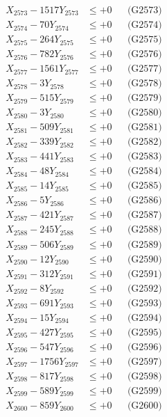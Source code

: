 \documentclass[a4paper,10pt]{article}
\begin{document}
{\begin{align}
X_{2573} - 1517Y_{2573} &\leq +0 && \text{(G2573)} \\
X_{2574} - 70Y_{2574} &\leq +0 && \text{(G2574)} \\
X_{2575} - 264Y_{2575} &\leq +0 && \text{(G2575)} \\
X_{2576} - 782Y_{2576} &\leq +0 && \text{(G2576)} \\
X_{2577} - 1561Y_{2577} &\leq +0 && \text{(G2577)} \\
X_{2578} - 3Y_{2578} &\leq +0 && \text{(G2578)} \\
X_{2579} - 515Y_{2579} &\leq +0 && \text{(G2579)} \\
X_{2580} - 3Y_{2580} &\leq +0 && \text{(G2580)} \\
\allowbreak
X_{2581} - 509Y_{2581} &\leq +0 && \text{(G2581)} \\
X_{2582} - 339Y_{2582} &\leq +0 && \text{(G2582)} \\
X_{2583} - 441Y_{2583} &\leq +0 && \text{(G2583)} \\
X_{2584} - 48Y_{2584} &\leq +0 && \text{(G2584)} \\
X_{2585} - 14Y_{2585} &\leq +0 && \text{(G2585)} \\
X_{2586} - 5Y_{2586} &\leq +0 && \text{(G2586)} \\
X_{2587} - 421Y_{2587} &\leq +0 && \text{(G2587)} \\
X_{2588} - 245Y_{2588} &\leq +0 && \text{(G2588)} \\
X_{2589} - 506Y_{2589} &\leq +0 && \text{(G2589)} \\
X_{2590} - 12Y_{2590} &\leq +0 && \text{(G2590)} \\
\allowbreak
X_{2591} - 312Y_{2591} &\leq +0 && \text{(G2591)} \\
X_{2592} - 8Y_{2592} &\leq +0 && \text{(G2592)} \\
X_{2593} - 691Y_{2593} &\leq +0 && \text{(G2593)} \\
X_{2594} - 15Y_{2594} &\leq +0 && \text{(G2594)} \\
X_{2595} - 427Y_{2595} &\leq +0 && \text{(G2595)} \\
X_{2596} - 547Y_{2596} &\leq +0 && \text{(G2596)} \\
X_{2597} - 1756Y_{2597} &\leq +0 && \text{(G2597)} \\
X_{2598} - 817Y_{2598} &\leq +0 && \text{(G2598)} \\
X_{2599} - 589Y_{2599} &\leq +0 && \text{(G2599)} \\
X_{2600} - 859Y_{2600} &\leq +0 && \text{(G2600)} \\

\end{align}}
\end{document}
